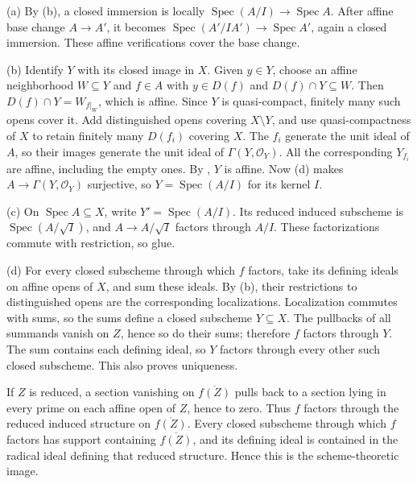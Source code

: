 (a) By (b), a closed immersion is locally $\operatorname{Spec}(A/I)\to\operatorname{Spec}A$. After affine base change $A\to A'$, it becomes $\operatorname{Spec}(A'/IA')\to\operatorname{Spec}A'$, again a closed immersion. These affine verifications cover the base change.

(b) Identify $Y$ with its closed image in $X$. Given $y\in Y$, choose an affine neighborhood $W\subseteq Y$ and $f\in A$ with $y\in D(f)$ and $D(f)\cap Y\subseteq W$. Then $D(f)\cap Y=W_{f|_W}$, which is affine. Since $Y$ is quasi-compact, finitely many such opens cover it. Add distinguished opens covering $X\setminus Y$, and use quasi-compactness of $X$ to retain finitely many $D(f_i)$ covering $X$. The $f_i$ generate the unit ideal of $A$, so their images generate the unit ideal of $\Gamma(Y,\mathcal O_Y)$. All the corresponding $Y_{f_i}$ are affine, including the empty ones. By , $Y$ is affine. Now (d) makes $A\to\Gamma(Y,\mathcal O_Y)$ surjective, so $Y=\operatorname{Spec}(A/I)$ for its kernel $I$.

(c) On $\operatorname{Spec}A\subseteq X$, write $Y'=\operatorname{Spec}(A/I)$. Its reduced induced subscheme is $\operatorname{Spec}(A/\sqrt I)$, and $A\to A/\sqrt I$ factors through $A/I$. These factorizations commute with restriction, so glue.

(d) For every closed subscheme through which $f$ factors, take its defining ideals on affine opens of $X$, and sum these ideals. By (b), their restrictions to distinguished opens are the corresponding localizations. Localization commutes with sums, so the sums define a closed subscheme $Y\subseteq X$. The pullbacks of all summands vanish on $Z$, hence so do their sums; therefore $f$ factors through $Y$. The sum contains each defining ideal, so $Y$ factors through every other such closed subscheme. This also proves uniqueness.

If $Z$ is reduced, a section vanishing on $\overline{f(Z)}$ pulls back to a section lying in every prime on each affine open of $Z$, hence to zero. Thus $f$ factors through the reduced induced structure on $\overline{f(Z)}$. Every closed subscheme through which $f$ factors has support containing $\overline{f(Z)}$, and its defining ideal is contained in the radical ideal defining that reduced structure. Hence this is the scheme-theoretic image.
